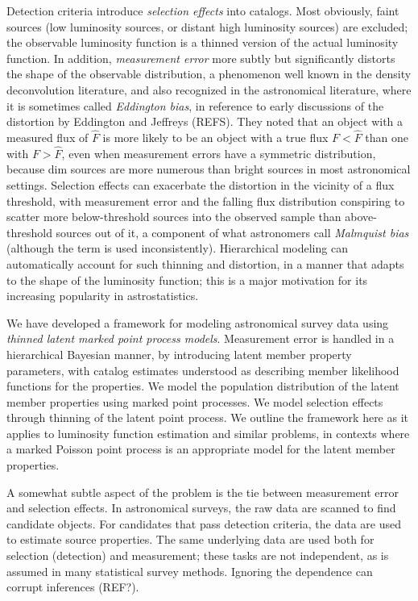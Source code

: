 Detection criteria introduce \emph{selection effects} into catalogs.
Most obviously, faint sources (low luminosity sources, or distant high luminosity sources) are excluded; the observable luminosity function is a thinned version of the actual luminosity function.
In addition, \emph{measurement error} more subtly but significantly distorts the shape of the observable distribution, a phenomenon well known in the density deconvolution literature, and also recognized in the astronomical literature, where it is sometimes called \emph{Eddington bias}, in reference to early discussions of the distortion by Eddington and Jeffreys (REFS).
They noted that an object with a measured flux of $\hat F$ is more likely to be an object with a true flux $F < \hat F$ than one with $F > \hat F$, even when measurement errors have a symmetric distribution, because dim sources are more numerous than bright sources in most astronomical settings.
Selection effects can exacerbate the distortion in the vicinity of a flux threshold, with measurement error and the falling flux distribution conspiring to scatter more below-threshold sources into the observed sample than above-threshold sources out of it, a component of what astronomers call \emph{Malmquist bias} \citep{binney1998galactic} (although the term is used inconsistently).
Hierarchical modeling can automatically account for such thinning and distortion, in a manner that adapts to the shape of the luminosity function; this is a major motivation for its increasing popularity in astrostatistics.

We have developed a framework for modeling astronomical survey data using \emph{thinned latent marked point process models}.
Measurement error is handled in a hierarchical Bayesian manner, by introducing latent member property parameters, with catalog estimates understood as describing member likelihood functions for the properties.
We model the population distribution of the latent member properties using marked point processes.
We model selection effects through thinning of the latent point process.
We outline the framework here as it applies to luminosity function estimation and similar problems, in contexts where a marked Poisson point process is an appropriate model for the latent member properties. 

A somewhat subtle aspect of the problem is the tie between measurement error and selection effects.
In astronomical surveys, the raw data are scanned to find candidate objects.
For candidates that pass detection criteria, the data are used to estimate source properties.
The same underlying data are used both for selection (detection) and measurement; these tasks are not independent, as is assumed in many statistical survey methods.
Ignoring the dependence can corrupt inferences (REF?).

